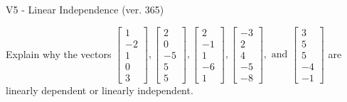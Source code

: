 \begin{exercise}
  \begin{exerciseTitle}V5 - Linear Independence (ver. 365)\end{exerciseTitle}
  \begin{exerciseStatement}
    Explain why the vectors \(\left[\begin{array}{r}
1 \\
-2 \\
1 \\
0 \\
3
\end{array}\right] , \left[\begin{array}{r}
2 \\
0 \\
-5 \\
5 \\
5
\end{array}\right] , \left[\begin{array}{r}
2 \\
-1 \\
1 \\
-6 \\
1
\end{array}\right] , \left[\begin{array}{r}
-3 \\
2 \\
4 \\
-5 \\
-8
\end{array}\right] , \text{ and } \left[\begin{array}{r}
3 \\
5 \\
5 \\
-4 \\
-1
\end{array}\right]\) are linearly dependent or linearly independent.	



\end{exerciseStatement}
\end{exercise}
